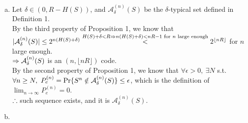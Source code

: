 \begin{pr}$ $

\renewcommand{\A}{{\mathcal{A}_\delta^{(n)}(S)}}

\begin{enumerate}[(a)]

\item Let $\delta\in(0, R-H(S))$, and $\A$ be the $\delta$-typical set defined in Definition 1.\\
By the third property of Proposition 1, we know that $|\A|\leq2^{n(H(S)+\delta)}\\
\overset{H(S)+\delta<R\then n(H(S)+\delta)<nR-1\text{ for }n\text{ large enough}}<2^{\lfloor nR\rfloor}$ for $n$ large enough.\\
$\then\A$ is an $(n, \lfloor nR\rfloor)$ code.\\
By the second property of Proposition 1, we know that $\forall\epsilon>0,\ \exists N$ s.t. $\forall n\geq N,\ P_e^{(n)}=\P\{S^n\notin\A\}\leq\epsilon$, which is the definition of $\lim_{n\to\infty}P_e^{(n)}=0$.\\
$\therefore$ such sequence exists, and it is $\A$.

\item
\end{enumerate}
\end{pr}
